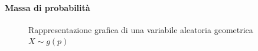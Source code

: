 \paragraph{Massa di probabilità}
\begin{figure}[h]
    \centering
{}
    \caption{Rappresentazione grafica di una variabile aleatoria geometrica $X \sim g{(p)}$}
    \label{fig:mod_geom}
    \vspace{\abovedisplayskip}
\end{figure}

